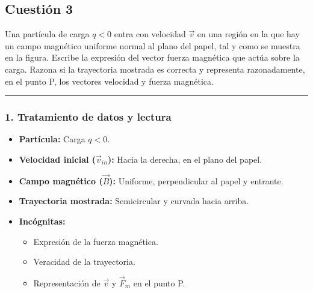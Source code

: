 \newpage
\subsection{Cuestión 3}
\label{subsec:C3_2021_jul_ext}

\begin{cajaenunciado}
Una partícula de carga $q<0$ entra con velocidad $\vec{v}$ en una región en la que hay un campo magnético uniforme normal al plano del papel, tal y como se muestra en la figura. Escribe la expresión del vector fuerza magnética que actúa sobre la carga. Razona si la trayectoria mostrada es correcta y representa razonadamente, en el punto P, los vectores velocidad y fuerza magnética.
\end{cajaenunciado}
\hrule

\subsubsection*{1. Tratamiento de datos y lectura}
\begin{itemize}
    \item \textbf{Partícula:} Carga $q < 0$.
    \item \textbf{Velocidad inicial ($\vec{v}_{in}$):} Hacia la derecha, en el plano del papel.
    \item \textbf{Campo magnético ($\vec{B}$):} Uniforme, perpendicular al papel y entrante.
    \item \textbf{Trayectoria mostrada:} Semicircular y curvada hacia arriba.
    \item \textbf{Incógnitas:}
    \begin{itemize}
        \item Expresión de la fuerza magnética.
        \item Veracidad de la trayectoria.
        \item Representación de $\vec{v}$ y $\vec{F}_m$ en el punto P.
    \end{itemize}
\end{itemize}


